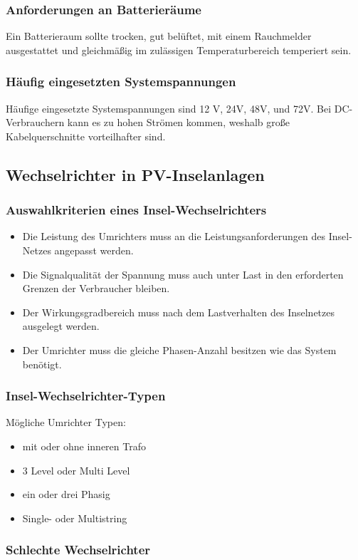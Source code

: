 \subsubsection{ Anforderungen an Batterieräume }
Ein Batterieraum sollte trocken, gut belüftet, mit einem Rauchmelder ausgestattet und gleichmäßig im zulässigen Temperaturbereich temperiert sein.
\subsubsection{Häufig eingesetzten Systemspannungen}
Häufige eingesetzte Systemspannungen sind 12 V, 24V, 48V, und 72V.
Bei DC-Verbrauchern kann es zu hohen Strömen kommen, weshalb große Kabelquerschnitte vorteilhafter sind.
\newpage
\subsection{Wechselrichter in PV-Inselanlagen}
\subsubsection{Auswahlkriterien eines Insel-Wechselrichters}
\begin{itemize}
    \item Die Leistung des Umrichters muss an die Leistungsanforderungen des Insel-Netzes angepasst werden.
    \item Die Signalqualität der Spannung muss auch unter Last in den erforderten Grenzen der Verbraucher bleiben.
    \item Der Wirkungsgradbereich muss nach dem Lastverhalten des Inselnetzes ausgelegt werden.
    \item Der Umrichter muss die gleiche Phasen-Anzahl besitzen wie das System benötigt.
\end{itemize}
\subsubsection{Insel-Wechselrichter-Typen}
Mögliche Umrichter Typen:
\begin{itemize}
    \item mit oder ohne inneren Trafo
    \item 3 Level oder Multi Level
    \item ein oder drei Phasig
    \item Single- oder Multistring
\end{itemize} 
\subsubsection{Schlechte Wechselrichter}

